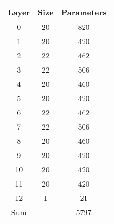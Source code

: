 \begin{tabular}{|c|c|c|}
\hline
Layer&Size&Parameters\\ 
\hline

0 & 20 & 820\\ 
\hline
1 & 20 & 420\\ 
\hline
2 & 22 & 462\\ 
\hline
3 & 22 & 506\\ 
\hline
4 & 20 & 460\\ 
\hline
5 & 20 & 420\\ 
\hline
6 & 22 & 462\\ 
\hline
7 & 22 & 506\\ 
\hline
8 & 20 & 460\\ 
\hline
9 & 20 & 420\\ 
\hline
10 & 20 & 420\\ 
\hline
11 & 20 & 420\\ 
\hline
12 & 1 & 21\\ 
\hline
Sum &  & 5797\\ 
\hline
\end{tabular}

